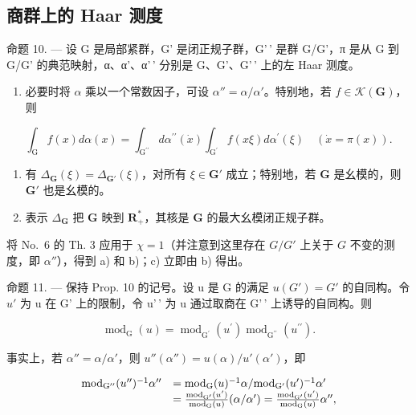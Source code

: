 \subsection{商群上的 Haar 测度}

命题 10. --- 设 G 是局部紧群，G' 是闭正规子群，G'\,' 是群 G/G'，π 是从 G 到 G/G' 的典范映射，α、α'、α'\,' 分别是 G、G'、G'\,' 上的左 Haar 测度。

\begin{enumerate}
\def\labelenumi{\alph{enumi})}
\tightlist
\item
  必要时将 \(\alpha\) 乘以一个常数因子，可设 \(\alpha'' = \alpha / \alpha'\)。特别地，若 \(f \in \mathcal{K}(\mathbf{G})\)，则
\end{enumerate}

\[
\int_ {\mathrm{G}} f (x) d \alpha (x) = \int_ {\mathrm{G} ^ {\prime \prime}} d \alpha^ {\prime \prime} (\dot {x}) \int_ {\mathrm{G} ^ {\prime}} f (x \xi) d \alpha^ {\prime} (\xi) \quad (\dot {x} = \pi (x)).
\]

\begin{enumerate}
\def\labelenumi{\alph{enumi})}
\setcounter{enumi}{1}
\item
  有 \(\Delta_{\mathbf{G}}(\xi) = \Delta_{\mathbf{G}'}(\xi)\)，对所有 \(\xi \in \mathbf{G}'\) 成立；特别地，若 \(\mathbf{G}\) 是幺模的，则 \(\mathbf{G}'\) 也是幺模的。
\item
  表示 \(\Delta_{\mathbf{G}}\) 把 \(\mathbf{G}\) 映到 \(\mathbf{R}_{+}^{*}\)，其核是 \(\mathbf{G}\) 的最大幺模闭正规子群。
\end{enumerate}

 将 No.~6 的 Th. 3 应用于 \(\chi = 1\)（并注意到这里存在 \(G / G'\) 上关于 \(G\) 不变的测度，即 \(\alpha''\)），得到 a) 和 b)；c) 立即由 b) 得出。

命题 11. --- 保持 Prop. 10 的记号。设 u 是 G 的满足 \(u(G') = G'\) 的自同构。令 \(u'\) 为 u 在 G' 上的限制，令 u'\,' 为 u 通过取商在 G'\,' 上诱导的自同构。则

\[
\operatorname{mod} _ {\mathrm{G}} (u) = \operatorname{mod} _ {\mathrm{G} ^ {\prime}} \left(u ^ {\prime}\right) \operatorname{mod} _ {\mathrm{G} ^ {\prime \prime}} \left(u ^ {\prime \prime}\right).
\]

事实上，若 \(\alpha'' = \alpha / \alpha'\)，则 \(u''(\alpha'') = u(\alpha) / u'(\alpha')\)，即

\[
\begin{array}{r l} \mathrm{mod} _ {\mathrm{G} ^ {\prime \prime}} (u ^ {\prime \prime}) ^ {- 1} \alpha^ {\prime \prime} & = \mathrm{mod} _ {\mathrm{G}} (u) ^ {- 1} \alpha / \mathrm{mod} _ {\mathrm{G} ^ {\prime}} (u ^ {\prime}) ^ {- 1} \alpha^ {\prime} \\ & = \frac {\mathrm{mod} _ {\mathrm{G} ^ {\prime}} (u ^ {\prime})}{\mathrm{mod} _ {\mathrm{G}} (u)} (\alpha / \alpha^ {\prime}) = \frac {\mathrm{mod} _ {\mathrm{G} ^ {\prime}} (u ^ {\prime})}{\mathrm{mod} _ {\mathrm{G}} (u)} \alpha^ {\prime \prime}, \end{array}
\]

